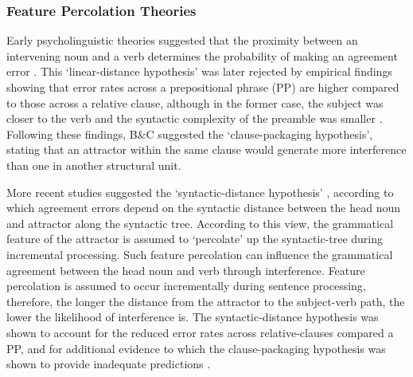 \subsubsection{Feature Percolation Theories}
Early psycholinguistic theories suggested that the proximity between an intervening noun and a verb determines the probability of making an agreement error \citep{quirk1972grammar}. This `linear-distance hypothesis' was later rejected by empirical findings showing that error rates across a prepositional phrase (PP) are higher compared to those across a relative clause, although in the former case, the subject was closer to the verb and the syntactic complexity of the preamble was smaller \citep{bock1992regulating}. Following these findings, B\&C suggested the `clause-packaging hypothesis', stating that an attractor within the same clause would generate more interference than one in another structural unit. 

More recent studies suggested the `syntactic-distance hypothesis' \citep{vigliocco1995constructing, vigliocco1999sex, franck2002subject}, according to which agreement errors depend on the syntactic distance between the head noun and attractor along the syntactic tree. According to this view, the grammatical feature of the attractor is assumed to `percolate’ up the syntactic-tree during incremental processing. Such feature percolation can influence the grammatical agreement between the head noun and verb through interference. Feature percolation is assumed to occur incrementally during sentence processing, therefore, the longer the distance from the attractor to the subject-verb path, the lower the likelihood of interference is. The syntactic-distance hypothesis was shown to account for the reduced error rates across relative-clauses compared a PP, and for additional evidence to which the clause-packaging hypothesis was shown to provide inadequate predictions \citep{franck2002subject}.

